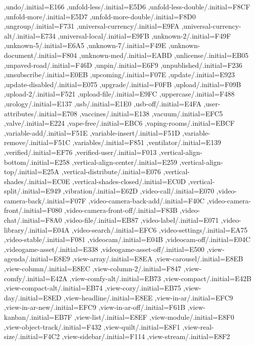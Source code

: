 { ,undo/.initial=E166
 ,unfold-less/.initial=E5D6
 ,unfold-less-double/.initial=F8CF
 ,unfold-more/.initial=E5D7
 ,unfold-more-double/.initial=F8D0
 ,ungroup/.initial=F731
 ,universal-currency/.initial=E9FA
 ,universal-currency-alt/.initial=E734
 ,universal-local/.initial=E9FB
 ,unknown-2/.initial=F49F
 ,unknown-5/.initial=E6A5
 ,unknown-7/.initial=F49E
 ,unknown-document/.initial=F804
 ,unknown-med/.initial=EABD
 ,unlicense/.initial=EB05
 ,unpaved-road/.initial=F46D
 ,unpin/.initial=E6F9
 ,unpublished/.initial=F236
 ,unsubscribe/.initial=E0EB
 ,upcoming/.initial=F07E
 ,update/.initial=E923
 ,update-disabled/.initial=E075
 ,upgrade/.initial=F0FB
 ,upload/.initial=F09B
 ,upload-2/.initial=F521
 ,upload-file/.initial=E9FC
 ,uppercase/.initial=F488
 ,urology/.initial=E137
 ,usb/.initial=E1E0
 ,usb-off/.initial=E4FA
 ,user-attributes/.initial=E708
 ,vaccines/.initial=E138
 ,vacuum/.initial=EFC5
 ,valve/.initial=E224
 ,vape-free/.initial=EBC6
 ,vaping-rooms/.initial=EBCF
 ,variable-add/.initial=F51E
 ,variable-insert/.initial=F51D
 ,variable-remove/.initial=F51C
 ,variables/.initial=F851
 ,ventilator/.initial=E139
 ,verified/.initial=EF76
 ,verified-user/.initial=F013
 ,vertical-align-bottom/.initial=E258
 ,vertical-align-center/.initial=E259
 ,vertical-align-top/.initial=E25A
 ,vertical-distribute/.initial=E076
 ,vertical-shades/.initial=EC0E
 ,vertical-shades-closed/.initial=EC0D
 ,vertical-split/.initial=E949
 ,vibration/.initial=E62D
 ,video-call/.initial=E070
 ,video-camera-back/.initial=F07F
 ,video-camera-back-add/.initial=F40C
 ,video-camera-front/.initial=F080
 ,video-camera-front-off/.initial=F83B
 ,video-chat/.initial=F8A0
 ,video-file/.initial=EB87
 ,video-label/.initial=E071
 ,video-library/.initial=E04A
 ,video-search/.initial=EFC6
 ,video-settings/.initial=EA75
 ,video-stable/.initial=F081
 ,videocam/.initial=E04B
 ,videocam-off/.initial=E04C
 ,videogame-asset/.initial=E338
 ,videogame-asset-off/.initial=E500
 ,view-agenda/.initial=E8E9
 ,view-array/.initial=E8EA
 ,view-carousel/.initial=E8EB
 ,view-column/.initial=E8EC
 ,view-column-2/.initial=F847
 ,view-comfy/.initial=E42A
 ,view-comfy-alt/.initial=EB73
 ,view-compact/.initial=E42B
 ,view-compact-alt/.initial=EB74
 ,view-cozy/.initial=EB75
 ,view-day/.initial=E8ED
 ,view-headline/.initial=E8EE
 ,view-in-ar/.initial=EFC9
 ,view-in-ar-new/.initial=EFC9
 ,view-in-ar-off/.initial=F61B
 ,view-kanban/.initial=EB7F
 ,view-list/.initial=E8EF
 ,view-module/.initial=E8F0
 ,view-object-track/.initial=F432
 ,view-quilt/.initial=E8F1
 ,view-real-size/.initial=F4C2
 ,view-sidebar/.initial=F114
 ,view-stream/.initial=E8F2
}
